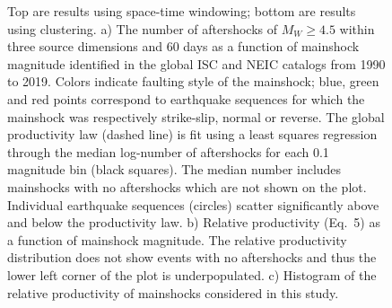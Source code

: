 \documentclass[draft]{agujournal}
\begin{document}
\begin{figure}[H]
    \caption{Top are results using space-time windowing; bottom are results using \citet{Zaliapin2008} clustering. a) The number of aftershocks of $M_W\ge4.5$ within three source dimensions and 60 days as a function of mainshock magnitude identified in the global ISC and NEIC catalogs from 1990 to 2019. Colors indicate faulting style of the mainshock; blue, green and red points correspond to earthquake sequences for which the mainshock was respectively strike-slip, normal or reverse. The global productivity law (dashed line) is fit using a least squares regression through the median log-number of aftershocks for each 0.1 magnitude bin (black squares). The median number includes mainshocks with no aftershocks which are not shown on the plot. Individual earthquake sequences (circles) scatter significantly above and below the productivity law. b) Relative productivity (Eq.~5) as a function of mainshock magnitude. The relative productivity distribution does not show events with no aftershocks and thus the lower left corner of the plot is underpopulated. c) Histogram of the relative productivity of mainshocks considered in this study.
    }
    \label{fig:fms_prod2_z2008}
\end{figure}
\end{document}
